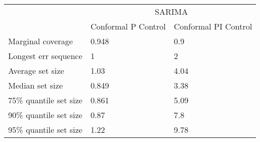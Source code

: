 \begin{tabular}{lll}
\toprule
& \multicolumn{2}{c}{SARIMA} \\
& Conformal P Control & Conformal PI Control \\
\midrule
Marginal coverage & 0.948 & 0.9 \\
Longest err sequence & 1 & 2 \\
Average set size & 1.03 & 4.04 \\
Median set size & 0.849 & 3.38 \\
75\% quantile set size & 0.861 & 5.09 \\
90\% quantile set size & 0.87 & 7.8 \\
95\% quantile set size & 1.22 & 9.78 \\
\bottomrule
\end{tabular}

